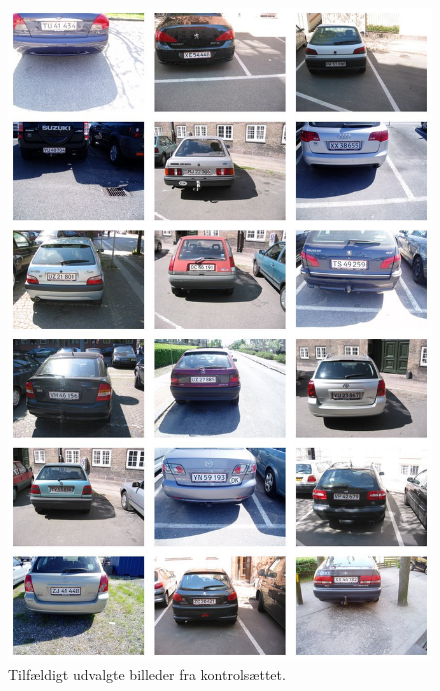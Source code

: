 \documentclass[11pt,a4paper,final]{article}
\begin{document}
\begin{figure}[htp]
\centering
\includegraphics[width=12cm]{appendix/illu/kontrolset.jpg} 
\caption{Tilfældigt udvalgte billeder fra kontrolsættet.}
\label{fig:illu:kontrolset}
\end{figure}
\end{document}
